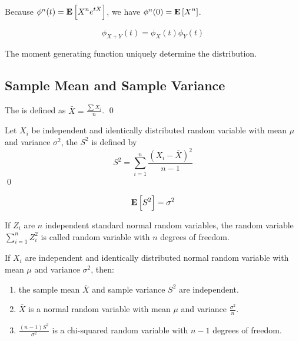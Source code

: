 Because $\phi^n (t) = \mathop{\bf E\/}\displaystyle \left[ X^n e^{tX} \right]$, we have $\phi^n(0) = \mathop{\bf E\/}\displaystyle \left[ X^n \right]$.

\begin{theorem}
    \begin{equation}
        \phi_{X+Y}(t) = \phi_X(t) \phi_Y(t)
    \end{equation}    
\end{theorem}

\begin{theorem}
The moment generating function uniquely determine the distribution.    
\end{theorem}




\subsection{Sample Mean and Sample Variance}

\begin{definition}
    The  is defined as $\displaystyle \bar{X} = \frac{\sum X_i}{n}$.
    \qed
\end{definition}

\begin{definition}
    Let $X_i$ be independent and identically distributed random variable with mean $\mu$ and variance $\sigma^2$, the  $S^2$ is defined by 
\begin{equation}
    S^2 = \sum_{i=1}^n \displaystyle \frac{(X_i - \bar{X})^2}{n - 1}
\end{equation} 
\qed
\end{definition}

\begin{theorem}
\begin{equation}
    \mathop{\bf E\/}\displaystyle \left[ S^2 \right] = \sigma^2
\end{equation}    
\end{theorem}


\begin{definition}
    If $Z_i$ are $n$ independent standard normal random variables, the random variable $\displaystyle \sum_{i=1}^n Z_i^2$ is called  random variable with $n$ degrees of freedom.
\end{definition}

\begin{theorem}
If $X_i$ are independent and identically distributed normal random variable with mean $\mu$ and variance $\sigma^2$, then:
    \begin{enumerate}
        \item the sample mean $\bar{X}$ and sample variance $S^2$ are independent.
        \item $\bar{X}$ is a normal random variable with mean $\mu$ and variance $\displaystyle \frac{\sigma^2}{n}$.
        \item $\displaystyle \frac{(n-1)S^2}{\sigma^2}$ is a chi-squared random variable with $n-1$ degrees of freedom.
    \end{enumerate}   
\end{theorem}

